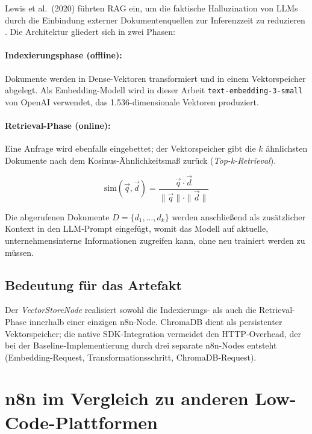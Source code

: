 \documentclass[12pt,a4paper,oneside]{report}
\begin{document}
Lewis et al.\ (2020) führten \ac{RAG} ein, um die faktische Halluzination von \ac{LLM}s
durch die Einbindung externer Dokumentenquellen zur Inferenzzeit zu reduzieren
\cite{lewis2020retrieval}. Die Architektur gliedert sich in zwei Phasen:

\paragraph{Indexierungsphase (offline):}
Dokumente werden in Dense-Vektoren transformiert und in einem Vektorspeicher abgelegt.
Als Embedding-Modell wird in dieser Arbeit \texttt{text-embedding-3-small} von OpenAI
verwendet, das 1.536-dimensionale Vektoren produziert.

\paragraph{Retrieval-Phase (online):}
Eine Anfrage wird ebenfalls eingebettet; der Vektorspeicher gibt die $k$ ähnlichsten
Dokumente nach dem Kosinus-Ähnlichkeitsmaß zurück (\textit{Top-k-Retrieval}).

\begin{equation}
  \text{sim}(\vec{q}, \vec{d}) = \frac{\vec{q} \cdot \vec{d}}{\|\vec{q}\| \cdot \|\vec{d}\|}
  \label{eq:cosine}
\end{equation}

Die abgerufenen Dokumente $D = \{d_1, \ldots, d_k\}$ werden anschließend als
zusätzlicher Kontext in den LLM-Prompt eingefügt, womit das Modell auf aktuelle,
unternehmensinterne Informationen zugreifen kann, ohne neu trainiert werden zu müssen.

\subsection{Bedeutung für das Artefakt}

Der \textit{VectorStoreNode} realisiert sowohl die Indexierungs- als auch die
Retrieval-Phase innerhalb einer einzigen n8n-Node. ChromaDB dient als persistenter
Vektorspeicher; die native SDK-Integration vermeidet den HTTP-Overhead, der bei der
Baseline-Implementierung durch drei separate n8n-Nodes entsteht (Embedding-Request,
Transformationsschritt, ChromaDB-Request).

\section{n8n im Vergleich zu anderen Low-Code-Plattformen}
\label{sec:lowcode-comparison}
\end{document}
